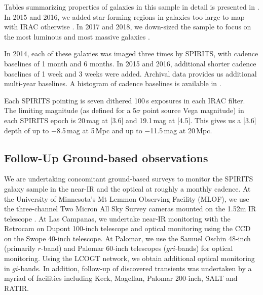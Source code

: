 \documentclass[twocolumn,times]{aastex6}
\begin{document}
Tables summarizing properties of galaxies in this sample in detail is presented in \citealt{SPIRITS10}. 
In 2015 and 2016, we added star-forming regions in galaxies too large to map with IRAC otherwise \citep{SPIRITS11}. 
In 2017 and 2018, we down-sized the sample to focus on the most luminous and most massive galaxies \citep{SPIRITS13}.  

In 2014, each of these galaxies was imaged three times by SPIRITS, with cadence baselines of 1 month
and 6 months. In 2015 and 2016, additional shorter cadence baselines of 1 week and 3 weeks were added. 
Archival data provides us additional multi-year baselines. A histogram of cadence baselines is available in  \citealt{SPIRITS11}.

Each SPIRITS pointing is seven dithered 100\,s exposures in each IRAC filter. The limiting magnitude (as defined for a 5$\sigma$ point source Vega magnitude) 
in each SPIRITS epoch is 20\,mag at [3.6] and 19.1\,mag at [4.5]. This gives us a [3.6] depth of up to $-$8.5\,mag 
at 5\,Mpc and up to $-$11.5\,mag at 20\,Mpc.

\subsection{Follow-Up Ground-based observations}
We are undertaking concomitant ground-based surveys to monitor the SPIRITS galaxy sample 
in the near-IR and the optical at roughly a monthly cadence.  At the University of Minnesota's Mt Lemmon Observing Facility (MLOF), 
we use the three-channel Two Micron All Sky Survey  cameras \citep{Milligan1996,Skrutskie2006}  mounted on the 1.52m IR telescope \citep{Low2007}.
At Las Campanas, we undertake near-IR
monitoring with the Retrocam on Dupont 100-inch telescope and optical monitoring using the
CCD on the Swope 40-inch telescope.  
At Palomar, we use the Samuel Oschin 48-inch (primarily $r$-band)
and Palomar 60-inch telescopes ($gri$-bands) for optical monitoring. Using the LCOGT network,
we obtain additional optical monitoring in $gi$-bands. In addition, follow-up of discovered transients 
was undertaken by a myriad of facilities including Keck, Magellan, Palomar 200-inch, SALT and RATIR.
\end{document}
